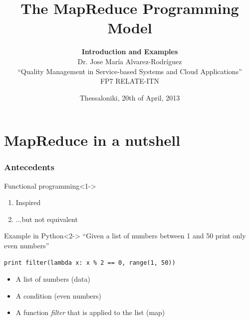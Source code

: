 \documentclass[xcolor=dvipsnames,dvip,notes=show,table]{beamer}
\title[MapReduce Intro]{The MapReduce Programming Model}
\author[Dr. Jose Mar\'{i}a Alvarez-Rodr\'{i}guez]{\textbf{Introduction and Examples}\\ \vspace{0.3cm} Dr. Jose Mar\'{i}a Alvarez-Rodr\'{i}guez \\ \vspace{0.3cm} ``Quality Management in Service-based Systems and Cloud Applications'' \\ \vspace{0.3cm} FP7 RELATE-ITN}
\subtitle{}
\institute{South East European Research Center}
\date{Thessaloniki, 20th of April, 2013}
\begin{document}
\frame{
\titlepage

}

\frame{
\tableofcontents

}


\section{MapReduce in a nutshell}




\begin{frame}[fragile]
  \frametitle{Antecedents}

\begin{alertblock}{Functional programming}<1->
\begin{enumerate}
 \item Inspired
 \item ...but not equivalent
\end{enumerate}
\end{alertblock}

\begin{exampleblock}{Example in Python}<2->
``Given a list of numbers between 1 and 50 print only even numbers''
\begin{lstlisting}
print filter(lambda x: x % 2 == 0, range(1, 50))
\end{lstlisting}
\tiny
\begin{itemize}
 \item A list of numbers (data)
 \item A condition (even numbers)
 \item A function \textit{filter} that is applied to the list (map)
\end{itemize}
\end{exampleblock}



\end{frame}
\end{document}
